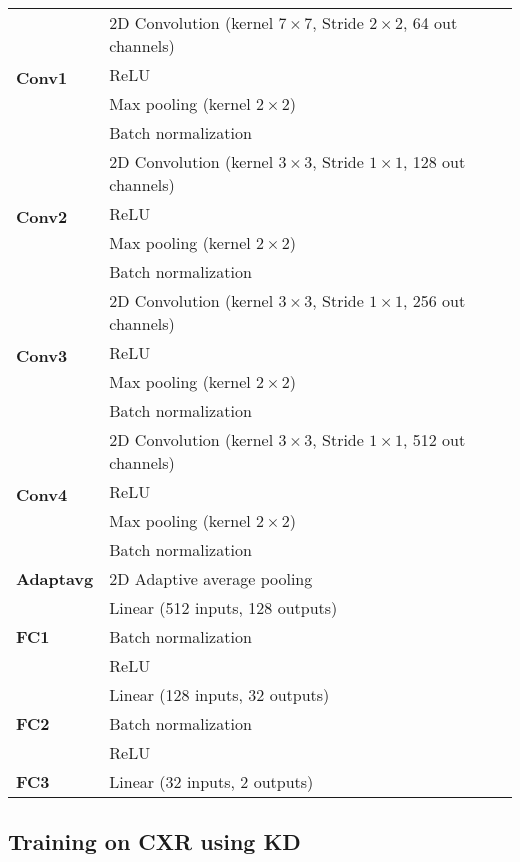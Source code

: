 \begin{longtable}{l|l}
    \hline
    \multirow{4}{*}{\textbf{Conv1}} & 2D Convolution (kernel $7\times7$, Stride $2\times2$, 64 out channels) \\
    & ReLU \\
    & Max pooling (kernel $2\times2$) \\
    & Batch normalization \\
    \hline
    \multirow{4}{*}{\textbf{Conv2}} & 2D Convolution (kernel $3\times3$, Stride $1\times1$, 128 out channels) \\
    & ReLU \\
    & Max pooling (kernel $2\times2$) \\
    & Batch normalization \\
    \hline
    \multirow{4}{*}{\textbf{Conv3}} & 2D Convolution (kernel $3\times3$, Stride $1\times1$, 256 out channels) \\
    & ReLU \\
    & Max pooling (kernel $2\times2$) \\
    & Batch normalization \\
    \hline
    \multirow{4}{*}{\textbf{Conv4}} & 2D Convolution (kernel $3\times3$, Stride $1\times1$, 512 out channels) \\
    & ReLU \\
    & Max pooling (kernel $2\times2$) \\
    & Batch normalization \\
    \hline
    \textbf{Adaptavg} & 2D Adaptive average pooling \\
    \hline
    \multirow{3}{*}{\textbf{FC1}} & Linear (512 inputs, 128 outputs) \\
    & Batch normalization \\
    & ReLU \\
    \hline
    \multirow{3}{*}{\textbf{FC2}} & Linear (128 inputs, 32 outputs) \\
    & Batch normalization \\
    & ReLU \\
    \hline
    \textbf{FC3} & Linear (32 inputs, 2 outputs) \\
    \hline
\end{longtable}


\subsection{Training on CXR using KD}\label{sec:training_on_cxr}


